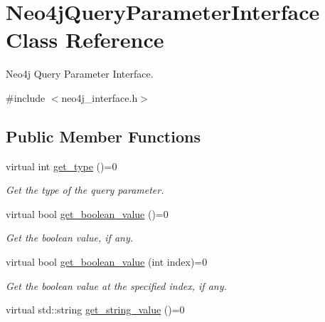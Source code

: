\hypertarget{classNeo4jQueryParameterInterface}{\section{Neo4j\-Query\-Parameter\-Interface Class Reference}
\label{classNeo4jQueryParameterInterface}
}


Neo4j Query Parameter Interface.  




{\ttfamily \#include $<$neo4j\-\_\-interface.\-h$>$}

\subsection*{Public Member Functions}
\begin{DoxyCompactItemize}
\item 
\hypertarget{classNeo4jQueryParameterInterface_a8c5aeb2e298552ae5d643f54fda6b067}{virtual int \hyperlink{classNeo4jQueryParameterInterface_a8c5aeb2e298552ae5d643f54fda6b067}{get\-\_\-type} ()=0}\label{classNeo4jQueryParameterInterface_a8c5aeb2e298552ae5d643f54fda6b067}

\begin{DoxyCompactList}\small\item\em Get the type of the query parameter. \end{DoxyCompactList}\item 
\hypertarget{classNeo4jQueryParameterInterface_ab74d0dad94e41520a821b4f0577b93fd}{virtual bool \hyperlink{classNeo4jQueryParameterInterface_ab74d0dad94e41520a821b4f0577b93fd}{get\-\_\-boolean\-\_\-value} ()=0}\label{classNeo4jQueryParameterInterface_ab74d0dad94e41520a821b4f0577b93fd}

\begin{DoxyCompactList}\small\item\em Get the boolean value, if any. \end{DoxyCompactList}\item 
\hypertarget{classNeo4jQueryParameterInterface_a8fbbc2d7c91b2db004d1e009b4b18cc4}{virtual bool \hyperlink{classNeo4jQueryParameterInterface_a8fbbc2d7c91b2db004d1e009b4b18cc4}{get\-\_\-boolean\-\_\-value} (int index)=0}\label{classNeo4jQueryParameterInterface_a8fbbc2d7c91b2db004d1e009b4b18cc4}

\begin{DoxyCompactList}\small\item\em Get the boolean value at the specified index, if any. \end{DoxyCompactList}\item 
\hypertarget{classNeo4jQueryParameterInterface_ac45d7e2c99c35161d4528e7b9d20b76b}{virtual std\-::string \hyperlink{classNeo4jQueryParameterInterface_ac45d7e2c99c35161d4528e7b9d20b76b}{get\-\_\-string\-\_\-value} ()=0}\label{classNeo4jQueryParameterInterface_ac45d7e2c99c35161d4528e7b9d20b76b}


\end{DoxyCompactItemize}
